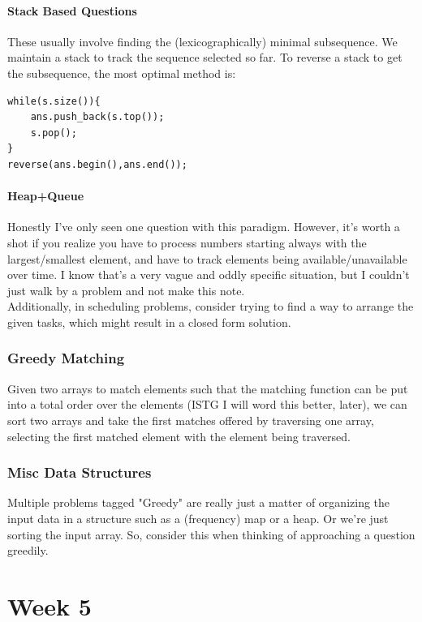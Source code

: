 \documentclass{report}
\begin{document}
\subsubsection*{Stack Based Questions}
These usually involve finding the (lexicographically) minimal
subsequence. We maintain a stack to track the sequence
selected so far. To reverse a stack to get the subsequence, the
most optimal method is:
\begin{lstlisting}
while(s.size()){
    ans.push_back(s.top());
    s.pop();
}
reverse(ans.begin(),ans.end());
\end{lstlisting}
\subsubsection*{Heap+Queue}
Honestly I've only seen one question with this paradigm. However,
it's worth a shot if you realize you have to process numbers
starting always with the largest/smallest element, and have to 
track elements being available/unavailable over time.
I know that's a very vague and oddly specific situation,
but I couldn't just walk by a problem and not make this note.
\\
Additionally, in scheduling problems, consider trying to find
a way to arrange the given tasks, which might result in a
closed form solution.
\subsection{Greedy Matching}
Given two arrays to match elements such that the matching function
can be put into a total order over the elements (ISTG I will word this better,
later), we can sort two arrays and take the first matches offered
by traversing one array, selecting the first matched element with
the element being traversed.
\subsection{Misc Data Structures}
Multiple problems tagged "Greedy" are really just a matter of
organizing the input data in a structure such as a (frequency)
map or a heap. Or we're just sorting the input array.
So, consider this when thinking of approaching 
a question greedily.
\chapter{Week 5}
\end{document}
